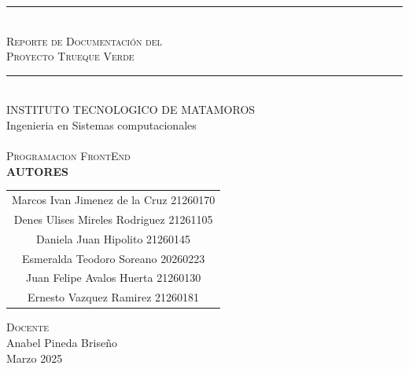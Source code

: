 \documentclass[11pt, a4paper, oneside]{book}
\begin{document}
\begin{titlepage}
    \centering
    
    \rule{\textwidth}{1.5pt}\\[0.5cm]
    
    \textsc{\Huge Reporte de Documentación del}\\[0.3cm]
\textsc{\Huge Proyecto Trueque Verde}\\[0.8cm]

    
    
    \rule{\textwidth}{1.5pt}\\[1cm]
    
    \large INSTITUTO TECNOLOGICO DE MATAMOROS \\[0.5cm]
    Ingenieria en Sistemas computacionales\\[1cm]

    
    \\[0.5cm]
        \textsc{Programacion FrontEnd}\\[0.5cm]

        \Large\textbf{AUTORES }\\[0.5cm]
    
      {\large 
      \begin{tabular}{c}
        Marcos Ivan Jimenez de la Cruz 21260170\\[0.3cm]
        Denes Ulises Mireles Rodriguez 21261105\\[0.3cm]
        Daniela Juan Hipolito 21260145\\[0.3cm]
        Esmeralda Teodoro Soreano 20260223\\[0.3cm]
        Juan Felipe Avalos Huerta 21260130\\[0.3cm]
        Ernesto Vazquez Ramirez 21260181\\
      \end{tabular}
    \par}
    \vspace{1cm}
    
    \textsc{Docente}\\[0.2cm]
    \large Anabel Pineda Briseño  \\[1cm]        
    \large Marzo 2025
    
\end{titlepage}
\renewcommand{\contentsname}{Índice} 
\end{document}
